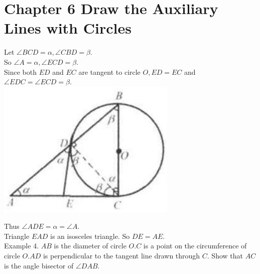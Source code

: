 \documentclass[10pt]{article}
\begin{document}
\section*{Chapter 6 Draw the Auxiliary Lines with Circles}
Let \(\angle B C D=\alpha, \angle C B D=\beta\).\\
So \(\angle A=\alpha, \angle E C D=\beta\).\\
Since both \(E D\) and \(E C\) are tangent to circle \(O, E D=E C\) and \(\angle E D C=\angle E C D=\beta\).\\
\includegraphics[max width=\textwidth, center]{2025_04_17_97bc1f7e44d93c271a88g-164}

Thus \(\angle A D E=\alpha=\angle A\).\\
Triangle \(E A D\) is an isosceles triangle. So \(D E=A E\).\\
Example 4. \(A B\) is the diameter of circle \(O . C\) is a point on the circumference of circle \(O . A D\) is perpendicular to the tangent line drawn through \(C\). Show that \(A C\) is the angle bisector of \(\angle D A B\).
\end{document}
